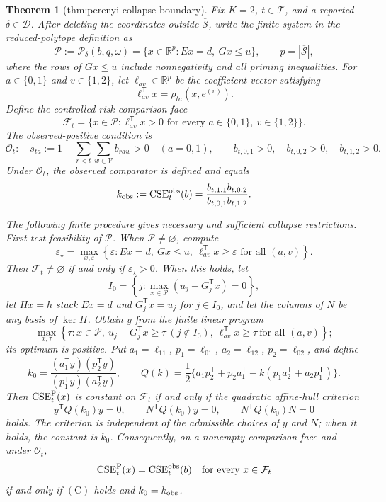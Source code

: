 \documentclass{article}
\newtheorem{theorem}{Theorem}
\begin{document}
\begin{theorem}[thm:perenyi-collapse-boundary]\label{thm:perenyi-collapse-boundary}
Fix \(K=2\), \(t\in\mathcal T\), and a reported \(\delta\in\mathcal D\).  After deleting the coordinates outside \(\overline{\mathcal S}\), write the finite system in the reduced-polytope definition as
\[
 \mathcal P:=\mathcal P_\delta(b,q,\omega)
   =\{x\in\mathbb R^p:E x=d,\ Gx\leq u\},
 \qquad p=|\overline{\mathcal S}|,
\]
where the rows of \(Gx\leq u\) include nonnegativity and all priming inequalities.  For \(a\in\{0,1\}\) and \(v\in\{1,2\}\), let \(\ell_{av}\in\mathbb R^p\) be the coefficient vector satisfying
\[
 \ell_{av}^{\mathsf T}x=\rho_{ta}(x,e^{(v)}).
\]
Define the controlled-risk comparison face
\[
 \mathcal F_t=\{x\in\mathcal P:\ell_{av}^{\mathsf T}x>0
                    \text{ for every }a\in\{0,1\},\ v\in\{1,2\}\}.
\]
The observed-positive condition is
\[
 \mathcal O_t:\quad
 s_{ta}:=1-\sum_{r<t}\sum_{w\in\mathcal V}b_{raw}>0
 \quad(a=0,1),
 \qquad b_{t,0,1}>0,\quad b_{t,0,2}>0,\quad b_{t,1,2}>0.
\]
Under \(\mathcal O_t\), the observed comparator is defined and equals
\[
 k_{\rm obs}:=\operatorname{CSE}^{\rm obs}_t(b)
 =\frac{b_{t,1,1}b_{t,0,2}}{b_{t,0,1}b_{t,1,2}}.
\]

The following finite procedure gives necessary and sufficient collapse restrictions.  First test feasibility of \(\mathcal P\).  When \(\mathcal P\neq\varnothing\), compute
\[
 \varepsilon_\star=\max_{x,\varepsilon}\left\{\varepsilon:
 Ex=d,\ Gx\leq u,\ \ell_{av}^{\mathsf T}x\geq\varepsilon
 \text{ for all }(a,v)\right\}.
\]
Then \(\mathcal F_t\neq\varnothing\) if and only if \(\varepsilon_\star>0\).  When this holds, let
\[
 I_0=\left\{j:\max_{x\in\mathcal P}
       (u_j-G_j^{\mathsf T}x)=0\right\},
\]
let \(Hx=h\) stack \(Ex=d\) and \(G_j^{\mathsf T}x=u_j\) for \(j\in I_0\), and let the columns of \(N\) be any basis of \(\ker H\).  Obtain \(y\) from the finite linear program
\[
 \max_{x,\tau}\left\{\tau:x\in\mathcal P,\ 
 u_j-G_j^{\mathsf T}x\geq\tau\ (j\notin I_0),\ 
 \ell_{av}^{\mathsf T}x\geq\tau\ \text{for all }(a,v)\right\};
\]
its optimum is positive.  Put \(a_1=\ell_{11}\), \(p_1=\ell_{01}\), \(a_2=\ell_{12}\), \(p_2=\ell_{02}\), and define
\[
 k_0=\frac{(a_1^{\mathsf T}y)(p_2^{\mathsf T}y)}
 {(p_1^{\mathsf T}y)(a_2^{\mathsf T}y)},
 \qquad
 Q(k)=\frac12\{a_1p_2^{\mathsf T}+p_2a_1^{\mathsf T}
 -k(p_1a_2^{\mathsf T}+a_2p_1^{\mathsf T})\}.
\]
Then \(\operatorname{CSE}^{\rm P}_t(x)\) is constant on \(\mathcal F_t\) if and only if the quadratic affine-hull criterion
\[
 y^{\mathsf T}Q(k_0)y=0,\qquad
 N^{\mathsf T}Q(k_0)y=0,\qquad
 N^{\mathsf T}Q(k_0)N=0                                      \tag{C}
\]
holds.  The criterion is independent of the admissible choices of \(y\) and \(N\); when it holds, the constant is \(k_0\).  Consequently, on a nonempty comparison face and under \(\mathcal O_t\),
\[
 \operatorname{CSE}^{\rm P}_t(x)=\operatorname{CSE}^{\rm obs}_t(b)
 \quad\hbox{for every }x\in\mathcal F_t
\]
if and only if \((\mathrm C)\) holds and \(k_0=k_{\rm obs}\).


\end{theorem}
\end{document}
